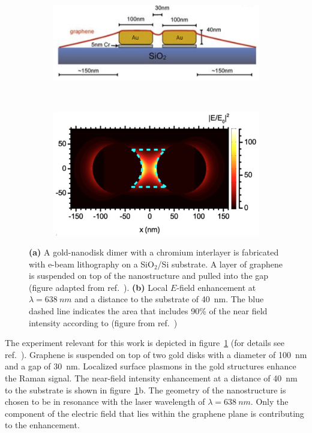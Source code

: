 \begin{figure}[!h]
  \centering
  \begin{subfigure}{0.45\textwidth}
    \includegraphics[width=\textwidth]{./images/sers-schema.png}
  \end{subfigure}
  ~
  \begin{subfigure}{0.45\textwidth}
    \includegraphics[width=\textwidth]{./images/local-enhancement-heeg.png}
  \end{subfigure}
  \caption{\textbf{(a)} A gold-nanodisk dimer with a chromium interlayer is fabricated with e-beam lithography on a SiO$_2$/Si substrate. A layer of graphene is suspended on top of the nanostructure and pulled into the gap (figure adapted from ref.~\cite{heeg}). \textbf{(b)} Local $E$-field enhancement at $\lambda = \SI{638}{nm}$ and a distance to the substrate of \SI{40}{nm}. The blue dashed line indicates the area that includes 90\% of the near field intensity according to \cite{heeg} (figure from ref.~\cite{heeg})}
  \label{fig:heeg-experiment}
\end{figure}

The experiment relevant for this work is depicted in figure~\ref{fig:heeg-experiment} (for details see ref.~\cite{heeg}). Graphene is suspended on top of two gold disks with a diameter of \SI{100}{nm} and a gap of \SI{30}{nm}. Localized surface plasmons in the gold structures enhance the Raman signal. The near-field intensity enhancement at a distance of \SI{40}{nm} to the substrate is shown in figure~\ref{fig:heeg-experiment}b. The geometry of the nanostructure is chosen to be in resonance with the laser wavelength of $\lambda = \SI{638}{nm}$. Only the component of the electric field that lies within the graphene plane is contributing to the enhancement.

